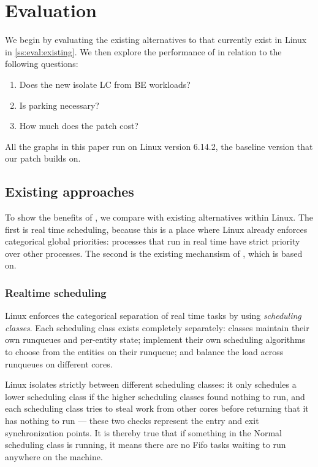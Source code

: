 \section{Evaluation}
\label{s:eval}

We begin by evaluating the existing alternatives to \cgroups{} that currently
exist in Linux in \autoref{ss:eval:existing}. We then explore the performance of
\schedbe{} in relation to the following questions:
\begin{enumerate}
    \item Does the new \schedbe{} isolate LC from BE workloads?
    \item Is parking necessary?
    \item How much does the patch cost?
\end{enumerate}

All the graphs in this paper run on Linux version 6.14.2, the baseline version
that our patch builds on.

\subsection{Existing approaches}\label{ss:eval:existing}

To show the benefits of \schedbe{}, we compare with existing alternatives within
Linux. The first is real time scheduling, because this is a place where Linux
already enforces categorical global priorities: processes that run in real time
have strict priority over other processes. The second is the existing mechansism
of \schedidle{}, which \schedbe{} is based on.

\subsubsection{Realtime scheduling}

Linux enforces the categorical separation of real time tasks by using
\textit{scheduling classes}. Each scheduling class exists completely separately:
classes maintain their own runqueues and per-entity state; implement their own
scheduling algorithms to choose from the entities on their runqueue; and balance
the load across runqueues on different cores.

Linux isolates strictly between different scheduling classes: it only schedules
a lower scheduling class if the higher scheduling classes found nothing to run,
and each scheduling class tries to steal work from other cores before returning
that it has nothing to run --- these two checks represent the entry and exit
synchronization points. It is thereby true that if something in the Normal
scheduling class is running, it means there are no Fifo tasks waiting to run
anywhere on the machine.

